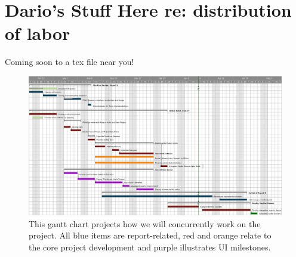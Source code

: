 \section{Dario's Stuff Here re: distribution of labor}

Coming soon to a tex file near you!



\hfil\eject \pdfpagewidth=8.5in \pdfpageheight=16in
\begin{figure}
\centering
\includegraphics[width=7in]{./img/gantt.png}
\caption{This gantt chart projects how we will concurrently work on
the project. All blue items are report-related, red and orange relate
to the core project development and purple illustrates UI milestones.}
\end{figure}
%
%
